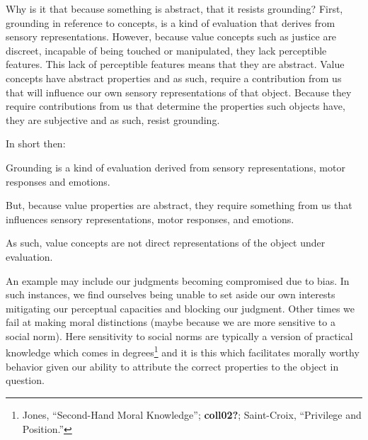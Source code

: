 \documentclass[
  12pt,
]{book}
\newenvironment{Shaded}{\begin{snugshade}}{\end{snugshade}}
\newcommand{\NormalTok}[1]{#1}
\theoremstyle{definition}
\theoremstyle{definition}
\theoremstyle{definition}
\theoremstyle{definition}
\theoremstyle{remark}
\begin{document}
Why is it that because something is abstract, that it resists grounding? First, grounding in reference to concepts, is a kind of evaluation that derives from sensory representations. However, because value concepts such as justice are discreet, incapable of being touched or manipulated, they lack perceptible features. This lack of perceptible features means that they are abstract. Value concepts have abstract properties and as such, require a contribution from us that will influence our own sensory representations of that object. Because they require contributions from us that determine the properties such objects have, they are subjective and as such, resist grounding.

In short then:

\begin{Shaded}
\begin{Highlighting}[]

\NormalTok{Grounding is a kind of evaluation derived from sensory representations, motor responses and emotions.}
\end{Highlighting}
\end{Shaded}

\begin{Shaded}
\begin{Highlighting}[]

\NormalTok{But, because value properties are abstract, they require something from us that influences sensory representations, motor responses, and emotions.}
\end{Highlighting}
\end{Shaded}

\begin{Shaded}
\begin{Highlighting}[]

\NormalTok{As such, value concepts are not direct representations of the object under evaluation.}
\end{Highlighting}
\end{Shaded}

An example may include our judgments becoming compromised due to bias. In such instances, we find ourselves being unable to set aside our own interests mitigating our perceptual capacities and blocking our judgment. Other times we fail at making moral distinctions (maybe because we are more sensitive to a social norm). Here sensitivity to social norms are typically a version of practical knowledge which comes in degrees\footnote{Jones, {``Second-{Hand Moral Knowledge}''}; \textbf{coll02?}; Saint-Croix, {``Privilege and {Position}.''}} and it is this which facilitates morally worthy behavior given our ability to attribute the correct properties to the object in question.
\end{document}
